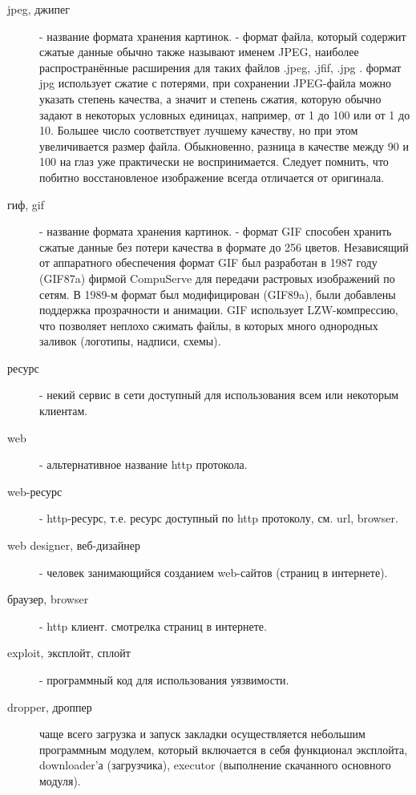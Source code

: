 \begin{description}
\item[jpeg, джипег]
 - название формата хранения картинок.
 - формат файла, который содержит сжатые данные обычно также называют именем JPEG, наиболее
 распространённые расширения для таких файлов .jpeg, .jfif, .jpg . формат jpg использует сжатие с
 потерями, при сохранении JPEG-файла можно указать степень качества, а значит и степень сжатия, которую
 обычно задают в некоторых условных единицах, например, от 1 до 100 или от 1 до 10. Большее число
 соответствует лучшему качеству, но при этом увеличивается размер файла. Обыкновенно, разница в
 качестве между 90 и 100 на глаз уже практически не воспринимается. Следует помнить, что побитно
 восстановленое изображение всегда отличается от оригинала.

\item[гиф, gif]
 - название формата хранения картинок.
- формат GIF способен хранить сжатые данные без потери качества в формате до 256 цветов. Независящий от аппаратного обеспечения формат GIF был разработан в 1987 году (GIF87a) фирмой CompuServe для передачи растровых изображений по сетям. В 1989-м формат был модифицирован (GIF89a), были добавлены поддержка прозрачности и анимации. GIF использует LZW-компрессию, что позволяет неплохо сжимать файлы, в которых много однородных заливок (логотипы, надписи, схемы).

\item[ресурс]
 - некий сервис в сети доступный для использования всем или некоторым клиентам.

\item[web]
 - альтернативное название http протокола.

\item[web-ресурс]
 - http-ресурс, т.е. ресурс доступный по http протоколу, см. url, browser.

\item[web designer, веб-дизайнер ]
 - человек занимающийся созданием web-сайтов (страниц в интернете).

\item[ браузер, browser ]
 - http клиент. смотрелка страниц в интернете.

\item[ exploit, эксплойт, сплойт ]
 - программный код для использования уязвимости.

\item[dropper, дроппер]
чаще всего загрузка и запуск закладки осуществляется небольшим программным модулем, который включается в себя функционал эксплойта, downloader'а (загрузчика), executor (выполнение скачанного основного модуля).


\end{description}

